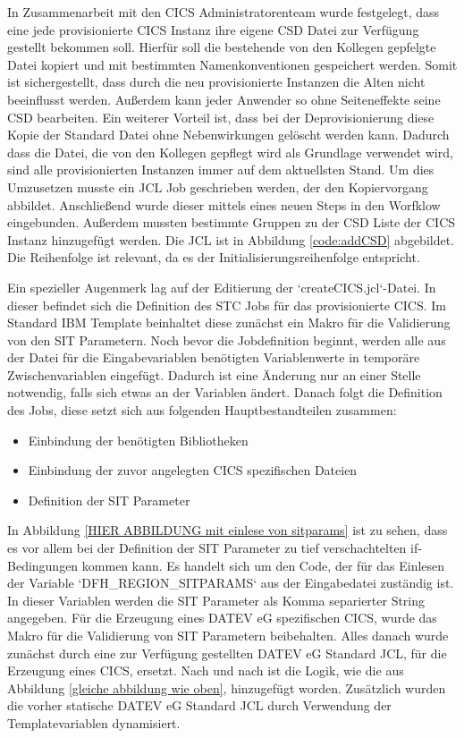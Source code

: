 In Zusammenarbeit mit den CICS Administratorenteam wurde festgelegt, dass eine jede provisionierte CICS Instanz ihre eigene CSD Datei zur Verfügung gestellt bekommen soll.
Hierfür soll die bestehende von den Kollegen gepfelgte Datei kopiert und mit bestimmten Namenkonventionen gespeichert werden.
Somit ist sichergestellt, dass durch die neu provisionierte Instanzen die Alten nicht beeinflusst werden.
Außerdem kann jeder Anwender so ohne Seiteneffekte seine CSD bearbeiten.
Ein weiterer Vorteil ist, dass bei der Deprovisionierung diese Kopie der Standard Datei ohne Nebenwirkungen gelöscht werden kann.
Dadurch dass die Datei, die von den Kollegen gepflegt wird als Grundlage verwendet wird, sind alle provisionierten Instanzen immer auf dem aktuellsten Stand.
Um dies Umzusetzen musste ein JCL Job geschrieben werden, der den Kopiervorgang abbildet.
Anschließend wurde dieser mittels eines neuen Steps in den Worfklow eingebunden.
Außerdem mussten bestimmte Gruppen zu der CSD Liste der CICS Instanz hinzugefügt werden.
Die JCL ist in Abbildung \ref{code:addCSD} abgebildet.
Die Reihenfolge ist relevant, da es der Initialisierungsreihenfolge entspricht.

Ein spezieller Augenmerk lag auf der Editierung der `createCICS.jcl`-Datei.
In dieser befindet sich die Definition des STC Jobs für das provisionierte CICS.
Im Standard IBM Template beinhaltet diese zunächst ein Makro für die Validierung von den SIT Parametern.
Noch bevor die Jobdefinition beginnt, werden alle aus der Datei für die Eingabevariablen benötigten Variablenwerte in temporäre Zwischenvariablen eingefügt.
Dadurch ist eine Änderung nur an einer Stelle notwendig, falls sich etwas an der Variablen ändert.
Danach folgt die Definition des Jobs, diese setzt sich aus folgenden Hauptbestandteilen zusammen:\\
\begin{itemize}
\item Einbindung der benötigten Bibliotheken
\item Einbindung der zuvor angelegten CICS spezifischen Dateien
\item Definition der SIT Parameter
\end{itemize}
In Abbildung \ref{HIER ABBILDUNG mit einlese von sitparams} ist zu sehen, dass es vor allem bei der Definition der SIT Parameter zu tief verschachtelten if-Bedingungen kommen kann.
Es handelt sich um den Code, der für das Einlesen der Variable `DFH\_REGION\_SITPARAMS` aus der Eingabedatei zuständig ist.
In dieser Variablen werden die SIT Parameter als Komma separierter String angegeben.
Für die Erzeugung eines DATEV eG spezifischen CICS, wurde das Makro für die Validierung von SIT Parametern beibehalten.
Alles danach wurde zunächst durch eine zur Verfügung gestellten DATEV eG Standard JCL, für die Erzeugung eines CICS, ersetzt.
Nach und nach ist die Logik, wie die aus Abbildung \ref{gleiche abbildung wie oben}, hinzugefügt worden.
Zusätzlich wurden die vorher statische DATEV eG Standard JCL durch Verwendung der Templatevariablen dynamisiert.

